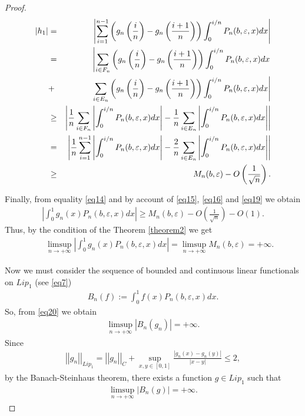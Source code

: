 \documentclass[10pt,a4paper]{amsart}
\begin{document}
\begin{proof}
		\begin{eqnarray}
			\label{eq19} \left|h_1\right| &=& \left| \sum_{i=1}^{n-1}\left(g_n\left(\frac{i}{n}\right)-g_n\left(\frac{i+1}{n}\right)\right)\int_{0}^{i/n}P_n(b, \varepsilon, x)dx  \right| \notag \\
			&=&  \left|\sum_{i\in F_n} \left(g_n \left(\frac{i}{n}\right) -g_n \left(\frac{i+1}{n}\right)\right)\int_{0}^{i/n}  P_n(b, \varepsilon,x)dx\right.  \\
			&+& \left.\sum_{i\in E_n} \left(g_n \left(\frac{i}{n}\right) -g_n \left(\frac{i+1}{n}\right)\right)\int_{0}^{i/n}  P_n(b, \varepsilon,x)dx\right| \notag \\
			&\geq& \left|\frac{1}{n} \sum_{i\in F_n} \left|\int_{0}^{i/n}  P_n(b, \varepsilon,x)dx\right| - \frac{1}{n} \sum_{i\in E_n} \left|\int_{0}^{i/n}  P_n(b, \varepsilon,x)dx\right| \right| \notag\\
			&=& \left|\frac{1}{n} \sum_{i=1}^{n-1} \left|\int_{0}^{i/n}  P_n(b, \varepsilon,x)dx\right| - \frac{2}{n} \sum_{i\in E_n} \left|\int_{0}^{i/n}  P_n(b, \varepsilon,x)dx\right| \right|  \notag \\
			&\geq& M_n(b,\varepsilon) - O\left(\frac{1}{\sqrt{n}}\right).\notag
		\end{eqnarray}
		
		Finally, from equality \eqref{eq14} and by account of \eqref{eq15}, \eqref{eq16} and \eqref{eq19} we obtain
		\begin{eqnarray*}
			\left|\int_{0}^{1} g_n(x) P_n(b, \varepsilon,x)dx\right| \geq M_n(b,\varepsilon) - O\left(\frac{1}{\sqrt{n}}\right)-O(1).
		\end{eqnarray*}
		Thus, by the condition of the Theorem \ref{theorem2} we get
		\begin{eqnarray} \label{eq20}
			&&\limsup_{n \rightarrow +\infty}\left|\int_{0}^{1} g_n(x) P_n(b, \varepsilon,x)dx\right| = \limsup_{n \rightarrow +\infty} M_n(b,\varepsilon) =+\infty. 
		\end{eqnarray}
		
		Now we must consider the sequence of bounded and continuous linear functionals on $Lip_1$ (see \eqref{eq7})
		\begin{eqnarray*}
			B_n(f):= \int_{0}^{1} f(x)  P_n(b, \varepsilon,x)dx.
		\end{eqnarray*}
		So, from \eqref{eq20} we obtain
		\begin{eqnarray*}
			\limsup_{n \rightarrow +\infty}\left|B_n \left(g_n\right)\right| =+ \infty.
		\end{eqnarray*}
		Since
		\begin{eqnarray*}
			\left|\left|g_n\right|\right|_{Lip_1} = 	\left|\left|g_n\right|\right|_C +\sup_{x,y \in \left[0,1\right]}  \frac{\left|g_n(x)-g_n(y)\right|}{\left|x-y\right|} \leq 2,
		\end{eqnarray*}
		by the Banach-Steinhaus theorem, there exists a function $g\in Lip_1$ such that
		\begin{eqnarray*}
			\limsup_{n \rightarrow +\infty}\left|B_n \left(g\right)\right| =+ \infty.
		\end{eqnarray*}
		

\end{proof}
\end{document}
